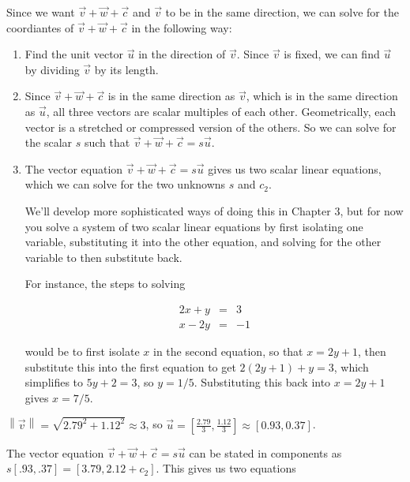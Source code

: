 \documentclass{ximera}
\begin{document}
\begin{problem}
  Since we want $\vec{v}+\vec{w}+\vec{c}$ and $\vec{v}$ to be in the same direction, we can solve for the coordiantes of $\vec{v}+\vec{w}+\vec{c}$ in the following way: 

\begin{enumerate}

\item Find the unit vector $\vec{u}$ in the direction of $\vec{v}$. Since $\vec{v}$ is fixed, we can find $\vec{u}$ by dividing $\vec{v}$ by its length.
\item Since $\vec{v}+\vec{w}+\vec{c}$ is in the same direction as $\vec{v}$, which is in the same direction as $\vec{u}$, all three vectors are scalar multiples of each other. Geometrically, each vector is a stretched or compressed version of the others. So we can solve for the scalar $s$ such that $\vec{v}+\vec{w}+\vec{c}=s\vec{u}$.
\item The vector equation $\vec{v}+\vec{w}+\vec{c}=s\vec{u}$ gives us two scalar linear equations, which we can solve for the two unknowns $s$ and $c_2$.

\begin{hint}

  We'll develop more sophisticated ways of doing this in Chapter 3, but for now you solve a system of two scalar linear equations by first isolating one variable, substituting it into the other equation, and solving for the other variable to then substitute back.

  For instance, the steps to solving 

  \[
  \begin{array}{ccc}
    2x+y&=&3\\
    x-2y&=&-1
  \end{array}
  \]

  would be to first isolate $x$ in the second equation, so that $x=2y+1$, then substitute this into the first equation to get $2(2y+1)+y=3$, which simplifies to $5y+2=3$, so $y=1/5$. Substituting this back into $x=2y+1$ gives $x=7/5$.

\end{hint}

\end{enumerate}

  \begin{solution}

  $\left\|\vec{v}\right\|=\sqrt{2.79^2+1.12^2}\approx 3$, so $\vec{u}=\left[\frac{2.79}{3},\frac{1.12}{3}\right]\approx [0.93,0.37]$. 

  The vector equation $\vec{v}+\vec{w}+\vec{c}=s\vec{u}$ can be stated in components as $s[.93,.37]=[3.79,2.12+c_2]$. This gives us two equations


\end{solution}
\end{problem}
\end{document}
